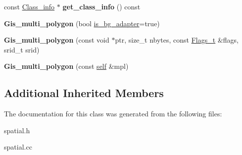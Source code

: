 \begin{DoxyCompactItemize}
\item 
\mbox{\label{classGis__multi__polygon_aa21a29375e8dadbb0612e63220359d24}} 
const \mbox{\hyperlink{classGeometry_1_1Class__info}{Class\+\_\+info}} $\ast$ {\bfseries get\+\_\+class\+\_\+info} () const
\item 
\mbox{\label{classGis__multi__polygon_ace45c0d4fcfb228cc4176f8b2bdfad23}} 
{\bfseries Gis\+\_\+multi\+\_\+polygon} (bool \mbox{\hyperlink{classGeometry_ada614004627a9e7af129e51a34242af9}{is\+\_\+bg\+\_\+adapter}}=true)
\item 
\mbox{\label{classGis__multi__polygon_a22c9628c7dc7b58529bf4cc0005734d4}} 
{\bfseries Gis\+\_\+multi\+\_\+polygon} (const void $\ast$ptr, size\+\_\+t nbytes, const \mbox{\hyperlink{classGeometry_1_1Flags__t}{Flags\+\_\+t}} \&flags, srid\+\_\+t srid)
\item 
\mbox{\label{classGis__multi__polygon_a61309215d8d545ac447cd5e11931a87d}} 
{\bfseries Gis\+\_\+multi\+\_\+polygon} (const \mbox{\hyperlink{classGis__multi__polygon}{self}} \&mpl)
\end{DoxyCompactItemize}
\subsection*{Additional Inherited Members}


The documentation for this class was generated from the following files\+:\begin{DoxyCompactItemize}
\item 
spatial.\+h\item 
spatial.\+cc\end{DoxyCompactItemize}
